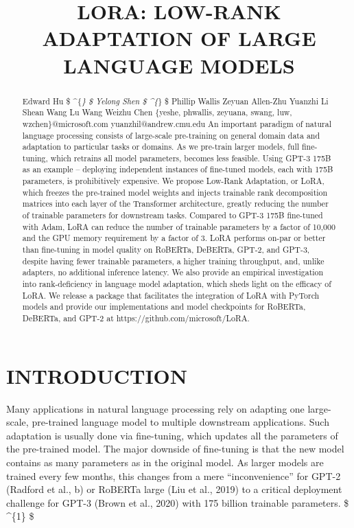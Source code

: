 \documentclass[conference]{IEEEtran}
\begin{document}
\title{LORA: LOW-RANK ADAPTATION OF LARGE LANGUAGE MODELS}


\maketitle

\begin{abstract}
Edward Hu \$ \textasciicircum{}\{\textit{\} \$ Yelong Shen \$ \textasciicircum{}\{}\} \$ Phillip Wallis Zeyuan Allen-Zhu Yuanzhi Li Shean Wang Lu Wang Weizhu Chen \{yeshe, phwallis, zeyuana, swang, luw, wzchen\}@microsoft.com yuanzhil@andrew.cmu.edu An important paradigm of natural language processing consists of large-scale pre-training on general domain data and adaptation to particular tasks or domains. As we pre-train larger models, full fine-tuning, which retrains all model parameters, becomes less feasible. Using GPT-3 175B as an example – deploying independent instances of fine-tuned models, each with 175B parameters, is prohibitively expensive. We propose Low-Rank Adaptation, or LoRA, which freezes the pre-trained model weights and injects trainable rank decomposition matrices into each layer of the Transformer architecture, greatly reducing the number of trainable parameters for downstream tasks. Compared to GPT-3 175B fine-tuned with Adam, LoRA can reduce the number of trainable parameters by a factor of 10,000 and the GPU memory requirement by a factor of 3. LoRA performs on-par or better than fine-tuning in model quality on RoBERTa, DeBERTa, GPT-2, and GPT-3, despite having fewer trainable parameters, a higher training throughput, and, unlike adapters, no additional inference latency. We also provide an empirical investigation into rank-deficiency in language model adaptation, which sheds light on the efficacy of LoRA. We release a package that facilitates the integration of LoRA with PyTorch models and provide our implementations and model checkpoints for RoBERTa, DeBERTa, and GPT-2 at https://github.com/microsoft/LoRA.
\end{abstract}


\section{INTRODUCTION}

Many applications in natural language processing rely on adapting one large-scale, pre-trained language model to multiple downstream applications. Such adaptation is usually done via fine-tuning, which updates all the parameters of the pre-trained model. The major downside of fine-tuning is that the new model contains as many parameters as in the original model. As larger models are trained every few months, this changes from a mere “inconvenience” for GPT-2 (Radford et al., b) or RoBERTa large (Liu et al., 2019) to a critical deployment challenge for GPT-3 (Brown et al., 2020) with 175 billion trainable parameters. \$ \textasciicircum{}\{1\} \$
\end{document}
